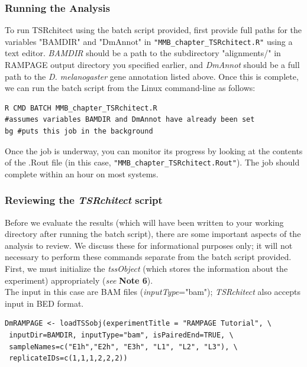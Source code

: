 \documentclass[runningheads,a4paper]{llncs}
\begin{document}
\begin{linenumbers}
\subsubsection{Running the Analysis}
To run TSRchitect using the batch script provided, first provide full paths for the variables "BAMDIR" and "DmAnnot" in \texttt{"MMB\_chapter\_TSRchitect.R"} using a text editor. 
\textit{BAMDIR} should be a path to the subdirectory "alignments/" in RAMPAGE output directory you specified earlier, and \textit{DmAnnot} should be a full path to the \textit{D. melanogaster} gene annotation listed above.
Once this is complete, we can run the batch script from the Linux command-line as follows:

\noindent
\begin{verbatim}
R CMD BATCH MMB_chapter_TSRchitect.R
#assumes variables BAMDIR and DmAnnot have already been set
bg #puts this job in the background
\end{verbatim}

Once the job is underway, you can monitor its progress by looking at the contents of the .Rout file (in this case, \texttt{"MMB\_chapter\_TSRchitect.Rout"}). 
The job should complete within an hour on most systems.\\

\subsubsection{Reviewing the \textit{TSRchitect} script} 
Before we evaluate the results (which will have been written to your working directory after running the batch script), there are some important aspects of the analysis to review. 
We discuss these for informational purposes only; it will not necessary to perform these commands separate from the batch script provided.
First, we must initialize the \textit{tssObject} (which stores the information about the experiment) appropriately (\textit{see} \textbf{Note 6}).\\

The input in this case are BAM files (\textit{inputType}="bam"); \textit{TSRchitect} also accepts input in BED format.

\noindent
\begin{verbatim}
DmRAMPAGE <- loadTSSobj(experimentTitle = "RAMPAGE Tutorial", \
 inputDir=BAMDIR, inputType="bam", isPairedEnd=TRUE, \
 sampleNames=c("E1h","E2h", "E3h", "L1", "L2", "L3"), \
 replicateIDs=c(1,1,1,2,2,2))
\end{verbatim}


\end{linenumbers}
\end{document}
